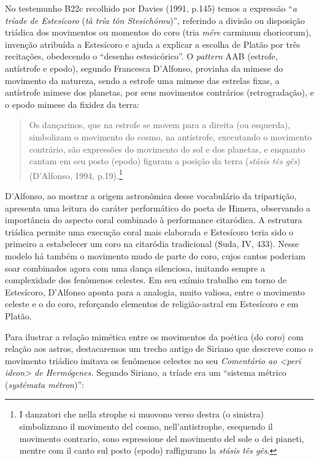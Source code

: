 No testemunho B22c recolhido por Davies (1991, p.145) temos a expressão
``\emph{a tríade de Estesícoro} (\emph{tà tría tôn Stesichórou})'',
referindo a divisão ou disposição triádica dos movimentos ou momentos do
coro (tria \emph{mére} carminum choricorum), invenção atribuída a
Estesícoro e ajuda a explicar a escolha de Platão por três recitações,
obedecendo o ``desenho estesicórico''. O \emph{pattern} AAB (estrofe,
antístrofe e epodo), segundo Francesca D'Alfonso, provinha da mimese do
movimento da natureza, sendo a estrofe uma mimese das estrelas fixas, a
antístrofe mimese dos planetas, por seus movimentos contrários
(retrogradação), e o epodo mimese da fixidez da terra:

\begin{quote}
Os dançarinos, que na estrofe se movem para a direita (ou esquerda),
simbolizam o movimento do cosmo, na antístrofe, executando o movimento
contrário, são expressões do movimento do sol e dos planetas, e enquanto
cantam em seu posto (epodo) figuram a posição da terra (\emph{stásis tês
gês}) (D'Alfonso, 1994, p.19).\footnote{I danzatori che nella strophe si
  muovono verso destra (o sinistra) simbolizzano il movimento del cosmo,
  nell'antistrophe, esequendo il movimento contrario, sono espressione
  del movimento del sole o dei pianeti, mentre com il canto sul posto
  (epodo) raffigurano la \emph{stásis tês gês}.}
\end{quote}

D'Alfonso, ao mostrar a origem astronômica desse vocabulário da
tripartição, apresenta uma leitura do caráter performático do poeta de
Himera, observando a importância do aspecto coral combinado à
performance citaródica. A estrutura triádica permite uma execução coral
mais elaborada e Estesícoro teria sido o primeiro a estabelecer um coro
na citaródia tradicional (Suda, IV, 433). Nesse modelo há também o
movimento mudo de parte do coro, cujos cantos poderiam soar combinados
agora com uma dança silenciosa, imitando sempre a complexidade dos
fenômenos celestes. Em seu exímio trabalho em torno de Estesícoro,
D'Alfonso aponta para a analogia, muito valiosa, entre o movimento
celeste e o do coro, reforçando elementos de religião-astral em
Estesícoro e em Platão.

Para ilustrar a relação mimética entre os movimentos da poética (do
coro) com relação aos astros, destacaremos um trecho antigo de Siriano
que descreve como o movimento triádico imitava os fenômenos celestes no
seu \emph{Comentário ao \textless{}peri ideon\textgreater{} de
Hermógenes.} Segundo Siriano, a tríade era um ``sistema métrico
(\emph{systémata métron})'':

